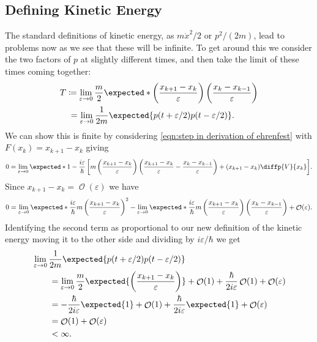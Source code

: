 \documentclass[fleqn]{NotesClass}
\newcommand*{\order}{\mathop{\mathcal{O}}}
\begin{document}
    \subsection{Defining Kinetic Energy}
    The standard definitions of kinetic energy, as \(m\dot{x}^2/2\) or \(p^2/(2m)\), lead to problems now as we see that these will be infinite.
    To get around this we consider the two factors of \(p\) at slightly different times, and then take the limit of these times coming together:
    \begin{align}
        T &\coloneqq \lim_{\varepsilon \to 0} \frac{m}{2} \expected*{\left( \frac{x_{k+1} - x_k}{\varepsilon} \right)\left( \frac{x_{k} - x_{k-1}}{\varepsilon} \right)}\\
        &\hphantom{:}= \lim_{\varepsilon \to 0} \frac{1}{2m} \expected{p(t + \varepsilon/2)p(t - \varepsilon/2)}.
    \end{align}
    We can show this is finite by considering \cref{eqn:step in derivation of ehrenfest} with \(F(x_k) = x_{k+1} - x_k\) giving
    \begin{equation}
        0 = \lim_{\varepsilon \to 0} \expected*{1-\frac{i\varepsilon}{\hbar} \left[ m\left( \frac{x_{k+1} - x_k}{\varepsilon} \right)\left( \frac{x_{k+1} - x_k}{\varepsilon} - \frac{x_{k} - x_{k-1}}{\varepsilon} \right) + (x_{k+1} - x_k) \diffp{V}{x_k} \right]}.
    \end{equation}
    Since \(x_{k+1} - x_k = \order(\varepsilon)\) we have
    \begin{equation}
        0 = \lim_{\varepsilon\to 0} \expected*{\frac{i\varepsilon}{\hbar} m\left( \frac{x_{k+1} - x_k}{\varepsilon} \right)^2} - \lim_{\varepsilon\to 0} \expected*{\frac{i\varepsilon}{\hbar}m\left( \frac{x_{k+1} - x_k}{\varepsilon} \right)\left( \frac{x_{k} - x_{k-1}}{\varepsilon} \right)} + \order(\varepsilon).
    \end{equation}
    Identifying the second term as proportional to our new definition of the kinetic energy moving it to the other side and dividing by \(i\varepsilon/\hbar\) we get
    \begin{align}
        &\lim_{\varepsilon\to 0} \frac{1}{2m}\expected{p(t + \varepsilon/2)p(t - \varepsilon/2)}\notag\\
        &\qquad= \lim_{\varepsilon\to 0}\frac{m}{2}\expected{\left( \frac{x_{k+1} - x_k}{\varepsilon} \right)} + \order(1) + \frac{\hbar}{2i\varepsilon}\order(1) + \order(\varepsilon)\\
        &\qquad= -\frac{\hbar}{2i\varepsilon}\expected{1} + \order(1) + \frac{\hbar}{2i\varepsilon}\expected{1} + \order(\varepsilon)\\
        &\qquad= \order(1) + \order(\varepsilon)\\
        &\qquad< \infty.
    \end{align}
    
\end{document}
